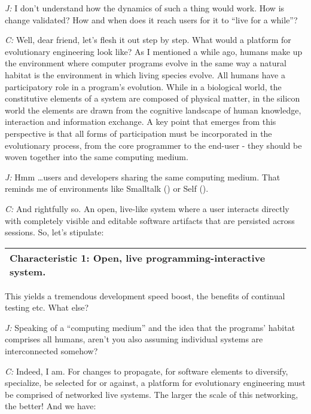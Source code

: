 \documentclass[10pt]{sigplanconf}
\begin{document}
\emph{J:} I don't understand how the dynamics of such a thing would work. How is change validated? How and when does it reach users for it to ``live for a while''?

\emph{C:} Well, dear friend, let's flesh it out step by step. What would a platform for evolutionary engineering look like? As I mentioned a while ago, humans make up the environment where computer programs evolve in the same way a natural habitat is the environment in which living species evolve. All humans have a participatory role in a program's evolution. While in a biological world, the constitutive elements of a system are composed of physical matter, in the silicon world the elements are drawn from the cognitive landscape of human knowledge, interaction and information exchange. A key point that emerges from this perspective is that all forms of participation must be incorporated in the evolutionary process, from the core programmer to the end-user - they should be woven together into the same computing medium.

\emph{J:} Hmm \ldots users and developers sharing the same computing medium. That reminds me of environments like Smalltalk (\cite{goldberg}) or Self (\cite{ungar}).

\emph{C:} And rightfully so. An open, live-like system where a user interacts directly with completely visible and editable software artifacts that are persisted across sessions. So, let's stipulate:

\bigskip

\begin{tabular}{|p{7cm}|}
\hline
\textbf{Characteristic 1: Open, live programming-interactive system.}
\\
\hline
\end{tabular}

\bigskip

This yields a tremendous development speed boost, the benefits of continual testing etc. What else?

\emph{J:} Speaking of a ``computing medium'' and the idea that the programs' habitat comprises all humans, aren't you also assuming individual systems are interconnected somehow?

\emph{C:} Indeed, I am. For changes to propagate, for software elements to diversify, specialize, be selected for or against, a platform for evolutionary engineering must be comprised of networked live systems. The larger the scale of this networking, the better! And we have:

\bigskip
\end{document}
